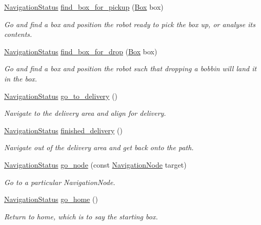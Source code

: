 \begin{DoxyCompactItemize}
\item 
\hyperlink{namespaceIDP_a1a96e566e4d675fdf20780cc96d92283}{NavigationStatus} \hyperlink{classIDP_1_1Navigation_a901e7ea6434975fb6e69b7764ce61793}{find\_\-box\_\-for\_\-pickup} (\hyperlink{namespaceIDP_ad90955841bc9492fb53b1f89cc667e18}{Box} box)
\begin{DoxyCompactList}\small\item\em Go and find a box and position the robot ready to pick the box up, or analyse its contents. \item\end{DoxyCompactList}\item 
\hyperlink{namespaceIDP_a1a96e566e4d675fdf20780cc96d92283}{NavigationStatus} \hyperlink{classIDP_1_1Navigation_a3e660be6e13f87e3a354a2acc1b43e83}{find\_\-box\_\-for\_\-drop} (\hyperlink{namespaceIDP_ad90955841bc9492fb53b1f89cc667e18}{Box} box)
\begin{DoxyCompactList}\small\item\em Go and find a box and position the robot such that dropping a bobbin will land it in the box. \item\end{DoxyCompactList}\item 
\hyperlink{namespaceIDP_a1a96e566e4d675fdf20780cc96d92283}{NavigationStatus} \hyperlink{classIDP_1_1Navigation_a86127033cad467249583319cde79a18e}{go\_\-to\_\-delivery} ()
\begin{DoxyCompactList}\small\item\em Navigate to the delivery area and align for delivery. \item\end{DoxyCompactList}\item 
\hyperlink{namespaceIDP_a1a96e566e4d675fdf20780cc96d92283}{NavigationStatus} \hyperlink{classIDP_1_1Navigation_a3cbe6924710b95c911d41612e9c4d862}{finished\_\-delivery} ()
\begin{DoxyCompactList}\small\item\em Navigate out of the delivery area and get back onto the path. \item\end{DoxyCompactList}\item 
\hyperlink{namespaceIDP_a1a96e566e4d675fdf20780cc96d92283}{NavigationStatus} \hyperlink{classIDP_1_1Navigation_a24b977f20868a385251d4becf187b815}{go\_\-node} (const \hyperlink{namespaceIDP_a286f26dda01010063dff761803b4cd16}{NavigationNode} target)
\begin{DoxyCompactList}\small\item\em Go to a particular NavigationNode. \item\end{DoxyCompactList}\item 
\hyperlink{namespaceIDP_a1a96e566e4d675fdf20780cc96d92283}{NavigationStatus} \hyperlink{classIDP_1_1Navigation_ab387bedd6d9f052b935565ac05aec2c4}{go\_\-home} ()
\begin{DoxyCompactList}\small\item\em Return to home, which is to say the starting box. \item\end{DoxyCompactList}\end{DoxyCompactItemize}

